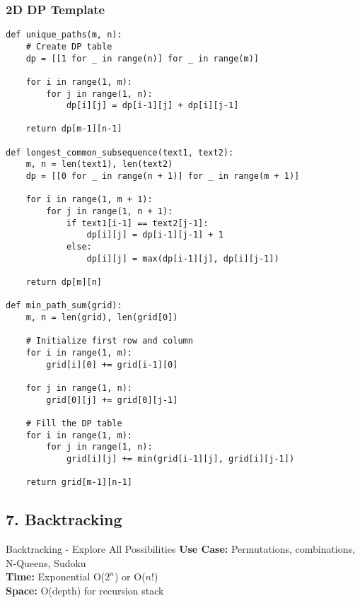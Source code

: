 \documentclass[10pt,a4paper]{article}
\begin{document}
\subsubsection{2D DP Template}
\begin{lstlisting}
def unique_paths(m, n):
    # Create DP table
    dp = [[1 for _ in range(n)] for _ in range(m)]

    for i in range(1, m):
        for j in range(1, n):
            dp[i][j] = dp[i-1][j] + dp[i][j-1]

    return dp[m-1][n-1]

def longest_common_subsequence(text1, text2):
    m, n = len(text1), len(text2)
    dp = [[0 for _ in range(n + 1)] for _ in range(m + 1)]

    for i in range(1, m + 1):
        for j in range(1, n + 1):
            if text1[i-1] == text2[j-1]:
                dp[i][j] = dp[i-1][j-1] + 1
            else:
                dp[i][j] = max(dp[i-1][j], dp[i][j-1])

    return dp[m][n]

def min_path_sum(grid):
    m, n = len(grid), len(grid[0])

    # Initialize first row and column
    for i in range(1, m):
        grid[i][0] += grid[i-1][0]

    for j in range(1, n):
        grid[0][j] += grid[0][j-1]

    # Fill the DP table
    for i in range(1, m):
        for j in range(1, n):
            grid[i][j] += min(grid[i-1][j], grid[i][j-1])

    return grid[m-1][n-1]
\end{lstlisting}

\subsection{7. Backtracking}

\begin{patternbox}{Backtracking - Explore All Possibilities}
\textbf{Use Case:} Permutations, combinations, N-Queens, Sudoku\\
\textbf{Time:} Exponential O($2^n$) or O($n!$)\\
\textbf{Space:} O(depth) for recursion stack
\end{patternbox}
\end{document}

